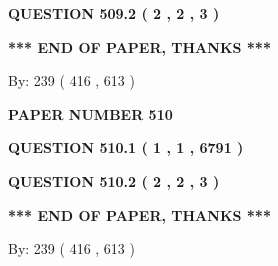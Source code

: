 \documentclass[12pt]{article}
\begin{document}
  
  
\vspace{0.2in}
  
{\textbf{\Large{QUESTION
509.2 
 ( 2 , 2 , 3 )
}}}
  
  
   
   
 \vspace{0.2in}
 
   
   
   
   
\vspace{1.0in} 
{\textbf{\large{ *** END OF PAPER, THANKS *** }}} 
   
   
\hspace{1.0in} By: 
 239 ( 416 ,  613 )
   
   
   
   
\newpage 
\setcounter{page}{ 
   510001 } 
   
   
   
   
 {\textbf{ \Large{ PAPER NUMBER  510  }}}
   
   
\vspace{0.2in}
   
   
   
   
   
   
 \vspace{0.2in}
 
 
 
 
   
   
  
\vspace{0.2in}
  
{\textbf{\Large{QUESTION
510.1 
 ( 1 , 1 , 6791 )
}}}
  
  
  
\vspace{0.2in}
  
{\textbf{\Large{QUESTION
510.2 
 ( 2 , 2 , 3 )
}}}
  
  
   
   
 \vspace{0.2in}
 
   
   
   
   
\vspace{1.0in} 
{\textbf{\large{ *** END OF PAPER, THANKS *** }}} 
   
   
\hspace{1.0in} By: 
 239 ( 416 ,  613 )
   
   
   
\end{document}
